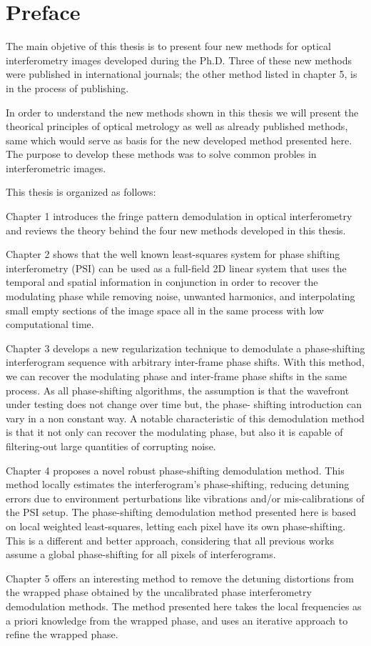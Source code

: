 \chapter*{Preface}

The main objetive of this thesis is to present four new methods for optical 
interferometry images developed during the Ph.D. Three of these new methods were 
published in international journals; the other method listed in chapter 5, is in
the process of publishing.

In order to understand the new methods shown in this thesis we will present the
theorical principles of optical metrology as well as already published methods, 
same which would serve as basis for the new developed method presented here. 
The purpose to develop these methods was to solve common probles in interferometric
images. 

This thesis is organized as follows:

Chapter 1 introduces the fringe pattern demodulation in optical 
interferometry and reviews the theory behind the four new methods developed in 
this thesis.

Chapter 2 shows that the well known least-squares system for phase shifting 
interferometry (PSI) can be used as a full-field 2D linear system that uses the 
temporal and spatial information in conjunction in order to recover the modulating 
phase while removing noise, unwanted harmonics, and interpolating small empty
sections of the image space all in the same process with low computational time.

Chapter 3 develops a new regularization technique to demodulate a 
phase-shifting interferogram sequence with arbitrary inter-frame phase shifts. 
With this method, we can recover the modulating phase and inter-frame phase
shifts in the same process. As all phase-shifting algorithms, the assumption
is that the wavefront under testing does not change over time but, the phase-
shifting introduction can vary in a non constant way. A notable characteristic
of this demodulation method is that it not only can recover the modulating
phase, but also it is capable of filtering-out large quantities of corrupting
noise.

Chapter 4 proposes a novel robust phase-shifting demodulation method. 
This method locally estimates the interferogram's phase-shifting, reducing 
detuning errors due to environment perturbations like vibrations and/or 
mis-calibrations of the PSI setup. The phase-shifting demodulation method
presented here is based on local weighted least-squares, letting each pixel
have its own phase-shifting. This is a different and better approach, considering 
that all previous works assume a global phase-shifting for all pixels
of interferograms.

Chapter 5 offers an interesting method to remove the detuning distortions from 
the wrapped phase obtained by the uncalibrated phase interferometry demodulation 
methods. The method presented here takes the local frequencies as a priori 
knowledge from the wrapped phase, and uses an iterative approach to refine the 
wrapped phase.
